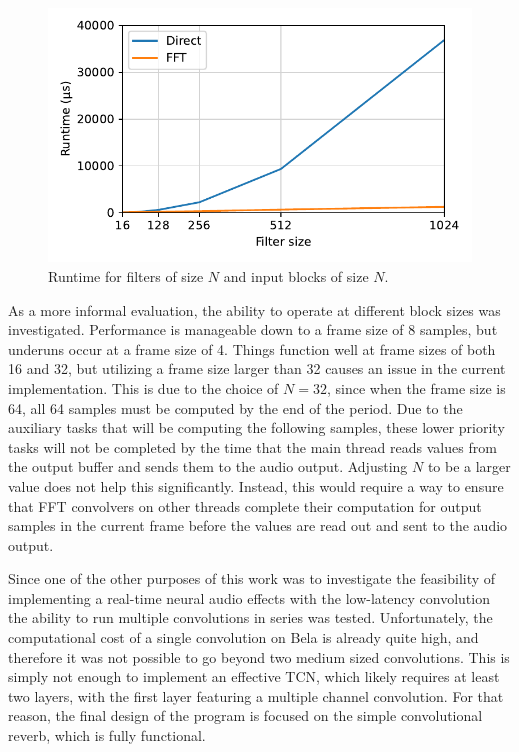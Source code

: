 \documentclass{article}
\begin{document}
\begin{figure}[h]
    \centering
    \includegraphics[width=0.65\linewidth]{figures/runtime.pdf}
    \caption{Runtime for filters of size $N$ and input blocks of size $N$.}
    \label{fig:runtime}
\end{figure}

As a more informal evaluation, the ability to operate at different block sizes was investigated. 
Performance is manageable down to a frame size of 8 samples, but underuns occur at a frame size of 4. 
Things function well at frame sizes of both 16 and 32, but utilizing a frame size larger than 32 causes an issue in the current implementation.
This is due to the choice of $N=32$, since when the frame size is 64, all 64 samples must be computed by the end of the period.
Due to the auxiliary tasks that will be computing the following samples, these lower priority tasks will not be completed by the time that 
the main thread reads values from the output buffer and sends them to the audio output. 
Adjusting $N$ to be a larger value does not help this significantly. 
Instead, this would require a way to ensure that FFT convolvers 
on other threads complete their computation for output samples in the 
current frame before the values are read out and sent to the audio output. 

Since one of the other purposes of this work was to investigate the feasibility of implementing a real-time neural audio effects
with the low-latency convolution the ability to run multiple convolutions in series was tested.
Unfortunately, the computational cost of a single convolution on Bela is already quite high, and therefore it was not possible 
to go beyond two medium sized convolutions. This is simply not enough to implement an effective TCN, 
which likely requires at least two layers, with the first layer featuring a multiple channel convolution.  
For that reason, the final design of the program is focused on the simple convolutional reverb, which is fully functional. 
\end{document}
